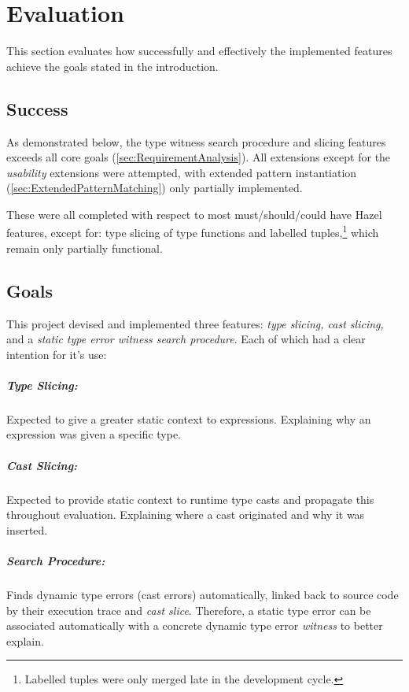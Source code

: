\chapter{Evaluation}\label{chap:Evaluation}
This section evaluates how successfully and effectively the implemented features achieve the goals stated in the introduction.

\section{Success}
As demonstrated below, the type witness search procedure and slicing features exceeds all core goals (\cref{sec:RequirementAnalysis}). All extensions except for the \textit{usability} extensions were attempted, with extended pattern instantiation (\cref{sec:ExtendedPatternMatching}) only partially implemented.

These were all completed with respect to most must/should/could have Hazel features, except for: type slicing of type functions and labelled tuples,\footnote{Labelled tuples were only merged late in the development cycle.} which remain only partially functional. 

\section{Goals}\label{sec:EvaluationGoals}
This project devised and implemented three features: \textit{type slicing, cast slicing,} and a \textit{static type error witness search procedure}. Each of which had a clear intention for it's use:

\paragraph{Type Slicing:} Expected to give a greater static context to expressions. Explaining why an expression was given a specific type.

\paragraph{Cast Slicing:} Expected to provide static context to runtime type casts and propagate this throughout evaluation. Explaining where a cast originated and why it was inserted.

\paragraph{Search Procedure:} Finds dynamic type errors (cast errors) automatically, linked back to source code by their execution trace and \textit{cast slice}. Therefore, a static type error can be associated automatically with a concrete dynamic type error \textit{witness} to better explain.

